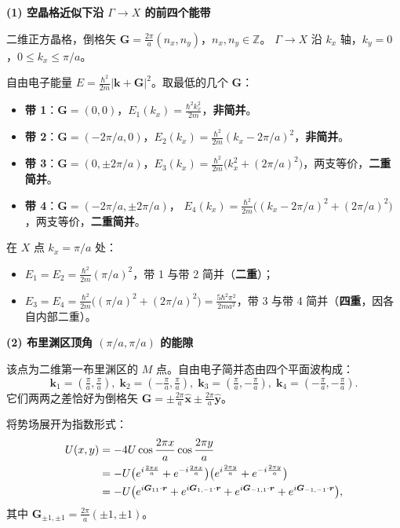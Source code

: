 \begin{derivationbox}[标准解题过程]
\textbf{(1) 空晶格近似下沿 $\Gamma\to X$ 的前四个能带}

二维正方晶格，倒格矢 $\bm{G}=\frac{2\pi}{a}(n_x,n_y)$，$n_x,n_y\in\mathbb{Z}$。
$\Gamma\to X$ 沿 $k_x$ 轴，$k_y=0$，$0\le k_x\le\pi/a$。

自由电子能量 $E=\frac{\hbar^2}{2m}|\bm{k}+\bm{G}|^2$。取最低的几个 $\bm{G}$：

\begin{itemize}
    \item \textbf{带 1}：$\bm{G}=(0,0)$，$E_1(k_x)=\frac{\hbar^2k_x^2}{2m}$，\textbf{非简并}。
    \item \textbf{带 2}：$\bm{G}=(-2\pi/a,0)$，$E_2(k_x)=\frac{\hbar^2}{2m}(k_x-2\pi/a)^2$，\textbf{非简并}。
    \item \textbf{带 3}：$\bm{G}=(0,\pm2\pi/a)$，$E_3(k_x)=\frac{\hbar^2}{2m}\bigl(k_x^2+(2\pi/a)^2\bigr)$，两支等价，\textbf{二重简并}。
    \item \textbf{带 4}：$\bm{G}=(-2\pi/a,\pm2\pi/a)$，
    $E_4(k_x)=\frac{\hbar^2}{2m}\bigl((k_x-2\pi/a)^2+(2\pi/a)^2\bigr)$，两支等价，\textbf{二重简并}。
\end{itemize}

在 $X$ 点 $k_x=\pi/a$ 处：
\begin{itemize}
    \item $E_1=E_2=\frac{\hbar^2}{2m}(\pi/a)^2$，带 1 与带 2 简并（\textbf{二重}）；
    \item $E_3=E_4=\frac{\hbar^2}{2m}\bigl((\pi/a)^2+(2\pi/a)^2\bigr)=\frac{5\hbar^2\pi^2}{2ma^2}$，带 3 与带 4 简并（\textbf{四重}，因各自内部二重）。
\end{itemize}

\textbf{(2) 布里渊区顶角 $(\pi/a,\pi/a)$ 的能隙}

该点为二维第一布里渊区的 $M$ 点。自由电子简并态由四个平面波构成：
\begin{equation}
\bm{k}_1=(\tfrac{\pi}{a},\tfrac{\pi}{a}),\;
\bm{k}_2=(-\tfrac{\pi}{a},\tfrac{\pi}{a}),\;
\bm{k}_3=(\tfrac{\pi}{a},-\tfrac{\pi}{a}),\;
\bm{k}_4=(-\tfrac{\pi}{a},-\tfrac{\pi}{a}).
\end{equation}
它们两两之差恰好为倒格矢 $\bm{G}=\pm\frac{2\pi}{a}\hat{\bm{x}}\pm\frac{2\pi}{a}\hat{\bm{y}}$。

将势场展开为指数形式：
\begin{align}
U(x,y)&=-4U\cos\frac{2\pi x}{a}\cos\frac{2\pi y}{a}\notag\\
&=-U\bigl(e^{i\frac{2\pi x}{a}}+e^{-i\frac{2\pi x}{a}}\bigr)
\bigl(e^{i\frac{2\pi y}{a}}+e^{-i\frac{2\pi y}{a}}\bigr)\notag\\
&=-U\bigl(e^{i\bm{G}_{11}\cdot\bm{r}}+e^{i\bm{G}_{1,-1}\cdot\bm{r}}
+e^{i\bm{G}_{-1,1}\cdot\bm{r}}+e^{i\bm{G}_{-1,-1}\cdot\bm{r}}\bigr),
\end{align}
其中 $\bm{G}_{\pm1,\pm1}=\frac{2\pi}{a}(\pm1,\pm1)$。


\end{derivationbox}
